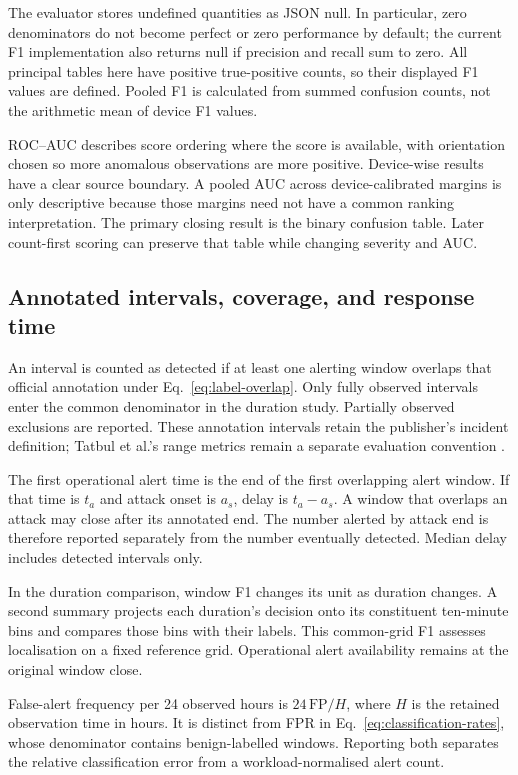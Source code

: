 The evaluator stores undefined quantities as JSON null. In particular,
zero denominators do not become perfect or zero performance by default;
the current F1 implementation also returns null if precision and recall
sum to zero. All principal tables here have positive true-positive counts,
so their displayed F1 values are defined. Pooled F1 is calculated from
summed confusion counts, not the arithmetic mean of device F1 values.

ROC--AUC describes score ordering where the score is available, with
orientation chosen so more anomalous observations are more positive.
Device-wise results have a clear source boundary. A pooled AUC across
device-calibrated margins is only descriptive because those margins need
not have a common ranking interpretation. The primary closing result is
the binary confusion table. Later count-first scoring can preserve that
table while changing severity and AUC.

\subsection{Annotated intervals, coverage, and response time}

An interval is counted as detected if at least one alerting window
overlaps that official annotation under Eq.~\eqref{eq:label-overlap}.
Only fully observed intervals enter the common denominator in the
duration study. Partially observed exclusions are reported. These
annotation intervals retain the publisher's incident definition; Tatbul
et al.'s range metrics remain a separate evaluation convention
\cite{tatbul2018}.

The first operational alert time is the end of the first overlapping
alert window. If that time is $t_a$ and attack onset is $a_s$, delay is
$t_a-a_s$. A window that overlaps an attack may close after its annotated
end. The number alerted by attack end is therefore reported separately
from the number eventually detected. Median delay includes detected
intervals only.

In the duration comparison, window F1 changes its unit as duration
changes. A second summary projects each duration's decision onto its
constituent ten-minute bins and compares those bins with their labels.
This common-grid F1 assesses localisation on a fixed reference grid.
Operational alert availability remains at the original window close.

False-alert frequency per 24 observed hours is
$24\,\mathrm{FP}/H$, where $H$ is the retained observation time in hours.
It is distinct from FPR in Eq.~\eqref{eq:classification-rates}, whose
denominator contains benign-labelled windows. Reporting both separates
the relative classification error from a workload-normalised alert count.

